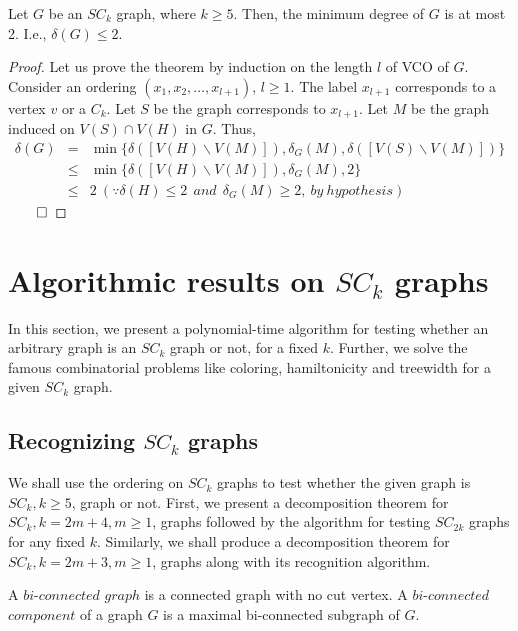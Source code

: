 \documentclass[runningheads]{llncs}
\begin{document}
\begin{lemma}
\label{mindegree}
Let $G$ be an $SC_k$ graph, where $k \geq 5$. Then, the minimum degree of $G$ is at most 2. I.e., $\delta(G) \leq 2$.
\end{lemma}

\begin{proof}
Let us prove the theorem by induction on the length $l$ of VCO of $G$.
\\
\noindent Consider an ordering $(x_1, x_2, \ldots, x_{l+1})$, $l \geq 1$. The label $x_{l+1}$ corresponds to a vertex $v$ or a $C_k$. Let $S$ be the graph corresponds to $x_{l+1}$. Let $M$ be the graph induced on $V(S)\cap V(H)$ in $G$. Thus,
\begin{eqnarray}
\nonumber
\delta(G) &=& \min \{\delta([V(H) \backslash V(M)]), \delta _G(M), \delta([V(S) \backslash V(M)])\} \\ \nonumber
&\leq & \min \{ \delta([V(H) \backslash V(M)]), \delta _G(M), 2\} \\ \nonumber
&\leq & 2 ~(\because \delta(H) \leq 2 ~~and ~~\delta _G(M) \geq 2 ,~ by~ hypothesis) 
\end{eqnarray}
$\hfill \qed$
\end{proof}

\section{Algorithmic results on $SC_k$ graphs}
In this section, we present a polynomial-time algorithm for testing whether an arbitrary graph is an $SC_k$ graph or not, for a fixed $k$. Further, we solve the famous combinatorial problems like coloring, hamiltonicity and treewidth for a given $SC_k$ graph.




\subsection{Recognizing $SC_k$ graphs}
We shall use the ordering on $SC_k$ graphs to test whether the given graph is $SC_k, k\geq 5$, graph or not. First, we present a decomposition theorem for $SC_{k}, k = 2m+4, m \geq 1$, graphs followed by the algorithm for testing $SC_{2k}$ graphs for any fixed $k$. Similarly, we shall produce a decomposition theorem for $SC_{k}, k = 2m+3, m \geq 1$, graphs along with its recognition algorithm.

\begin{definition}
A $bi$-$connected$ $graph$ is a connected graph with no cut vertex. A $bi$-$connected$ $component$ of a graph $G$ is a maximal bi-connected subgraph of $G$. 
\end{definition}
\end{document}
